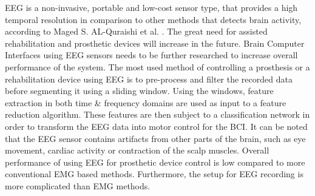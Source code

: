 \documentclass[../main.tex]{subfiles}
\begin{document}
EEG is a non-invasive, portable and low-cost sensor type, that provides a high temporal resolution in comparison to other methods that detects brain activity, according to Maged S. AL-Quraishi et al. \cite{quraishi2018}.
The great need for assisted rehabilitation and prosthetic devices will increase in the future.
Brain Computer Interfaces using EEG sensors needs to be further researched to increase overall performance of the system.
The most used method of controlling a prosthesis or a rehabilitation device using EEG is to pre-process and filter the recorded data before segmenting it using a sliding window.
Using the windows, feature extraction in both time \& frequency domains are used as input to a feature reduction algorithm.
These features are then subject to a classification network in order to transform the EEG data into motor control for the BCI.
It can be noted that the EEG sensor contains artifacts from other parts of the brain, such as eye movement, cardiac activity or contraction of the scalp muscles. 
Overall performance of using EEG for prosthetic device control is low compared to more conventional EMG based methods.
Furthermore, the setup for EEG recording is more complicated than EMG methods.



\end{document}
